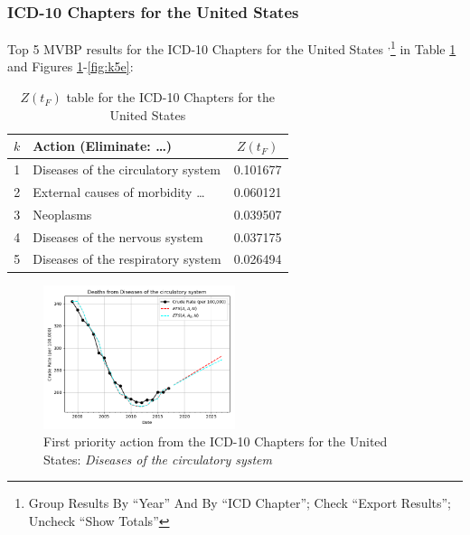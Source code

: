 \documentclass[10pt, a4paper, twocolumn]{IEEEconf}
\newcommand\footnotesstartsep{\textsuperscript{,}}
\begin{document}
\clearpage

\subsubsection{ICD-10 Chapters for the United States}

Top 5 MVBP results for the ICD-10 Chapters for the United States \citep{centers2017underlying}\footnotesstartsep\footnote{Group Results By \enquote{Year} And By \enquote{ICD Chapter}; Check \enquote{Export Results}; Uncheck \enquote{Show Totals}} in Table \ref{table:ztable5} and Figures \ref{fig:k5a}-\ref{fig:k5e}:

\begin{table}[H]
  \centering
  \begin{tabular}{clc}
    \toprule
      $k$ & Action (Eliminate: \ldots) & $Z(t_F)$ \\
    \midrule
      1 &         Diseases of the circulatory system & 0.101677 \\
      2 &        External causes of morbidity \ldots & 0.060121 \\
      3 &                                  Neoplasms & 0.039507 \\
      4 &             Diseases of the nervous system & 0.037175 \\
      5 &         Diseases of the respiratory system & 0.026494 \\
  \end{tabular}
  \caption{$Z(t_F)$ table for the ICD-10 Chapters for the United States}
  \label{table:ztable5}
\end{table}

\begin{figure}[H]
  \centering
  \includegraphics[width=0.5\textwidth]{results/US_ICD10_CHAPTERS/Diseases_of_the_circulatory_system_ets.png}
  \caption{First priority action from the ICD-10 Chapters for the United States: \textit{Diseases of the circulatory system}}\label{fig:k5a}
\end{figure}
\end{document}
